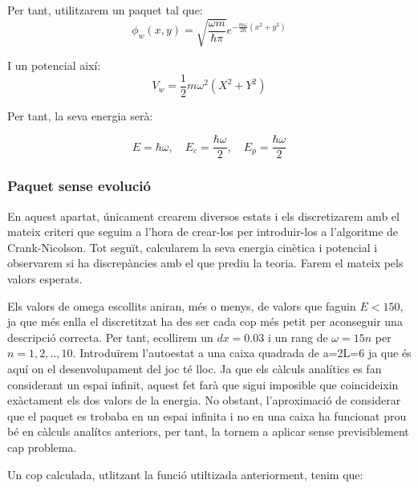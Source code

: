 \documentclass{article}
\begin{document}
Per tant, utilitzarem un paquet tal que:
\begin{equation}
\phi_w(x,y)=\sqrt{\frac{\omega m}{\hbar\pi}}e^{-\frac{m\omega}{2\hbar}(x^2 +y^2)}
\end{equation}

I un potencial així:
\begin{equation}
V_w=\frac{1}{2}m\omega^2(X^2+Y^2)
\end{equation}

Per tant, la seva energia serà:

\begin{equation}
E=\hbar\omega, \quad E_c=\frac{\hbar\omega}{2}, \quad E_p=\frac{\hbar\omega}{2}
\end{equation}

\subsubsection{Paquet sense evolució}
En aquest apartat, únicament crearem diversos estats i els discretizarem amb el mateix criteri que seguim a l'hora de crear-los per introduir-los a l'algoritme de Crank-Nicolson. Tot seguït, calcularem la seva energia cinètica i potencial i observarem si ha discrepàncies amb el que prediu la teoria. Farem el mateix pels valors esperats.

Els valors de omega escollits aniran, més o menys, de valors que faguin \(E<150\), ja que més enlla el discretitzat ha des ser cada cop més petit per 
aconseguir una descripció correcta. Per tant, ecollirem un \(dx=0.03\) i un rang de \(\omega=15n\) per \(n=1,2,..,10\). Introduïrem l'autoestat a una caixa quadrada de a=2L=6 ja que és aquí on el desenvolupament del joc té lloc. Ja que els càlculs analítics es fan considerant un espai infinit, aquest fet
farà que sigui imposible que coincideixin exàctament els dos valors de la energia. No obstant, l'aproximació de considerar que el paquet es trobaba en un espai infinita i no en una caixa ha funcionat prou bé en càlculs analítcs anteriors, per tant, la tornem a aplicar sense previsiblement cap problema.

Un cop calculada, utlitzant la funció utiltizada anteriorment, tenim que:
\end{document}
